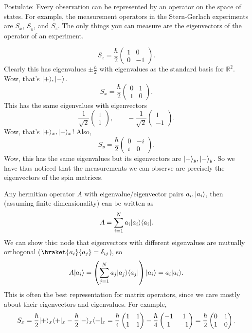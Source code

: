 Postulate: Every observation can be represented by an operator on the space of states. For example, the measurement operators in the Stern-Gerlach experiments are $S_x$, $S_y$, and $S_z$. The only things you can measure are the eigenvectors of the operator of an experiment.

\[
	S_z =\frac{\hbar}{2} \begin{pmatrix}
	1 & 0 \\
	0 & -1
	\end{pmatrix}
.\]
Clearly this has eigenvalues $\pm \frac{\hbar}{2} $ with eigenvalues as the standard basis for $\mathbb{R} ^2$. Wow, that's $\lvert+\rangle ,\lvert-\rangle $.
\[
	S_x = \frac{\hbar}{2}\begin{pmatrix}
	0 & 1 \\
	1 & 0
	\end{pmatrix}
.\]
This has the same eigenvalues with eigenvectors
\[
	\frac{1}{\sqrt{2} } \begin{pmatrix}
	1 \\
	1
	\end{pmatrix},\qquad -\frac{1}{\sqrt{2} } \begin{pmatrix}
	1 \\
	-1
	\end{pmatrix}
.\]
Wow, that's $\lvert+\rangle_x ,\lvert-\rangle_x $! Also,
\[
	S_y =\frac{\hbar}{2}  \begin{pmatrix}
	0 & -i \\
	i & 0
	\end{pmatrix}
.\]
Wow, this has the same eigenvalues but its eigenvectors are $\lvert+\rangle _y,\lvert-\rangle _y$. So we have thus noticed that the measurements we can observe are precisely the eigenvectors of the spin matrices.

Any hermitian operator $A$ with eigenvalue/eigenvector pairs $a_i,\lvert a_i\rangle $, then (assuming finite dimensionality) can be written as
\[
	A= \sum_{i=1}^{N} a_i \lvert a_i\rangle \langle a_i\rvert 
.\]
We can show this: node that eigenvectors with different eigenvalues are mutually orthogonal ($\braket{a_i}{a_j} =\delta _{ij} $), so
\[
	A \lvert a_i\rangle = \left( \sum_{j=1}^{N} a_j\lvert a_j\rangle \langle a_j\rvert  \right) \lvert a_i\rangle =a_i \lvert a_i\rangle 
.\]
This is often the best representation for matrix operators, since we care mostly about their eigenvectors and eigenvalues. For example,
\[
	S_x = \frac{\hbar}{2} \lvert+\rangle_x\langle+\rvert_x-\frac{\hbar}{2} \lvert-\rangle_x\langle-\rvert_x = \frac{\hbar}{4} \begin{pmatrix}
	1 & 1 \\
	1 & 1
	\end{pmatrix}-\frac{\hbar}{4} \begin{pmatrix}
	-1 & 1 \\
	1 & -1
	\end{pmatrix}=\frac{\hbar}{2} \begin{pmatrix}
	0 & 1 \\
	1 & 0
	\end{pmatrix}
.\]

